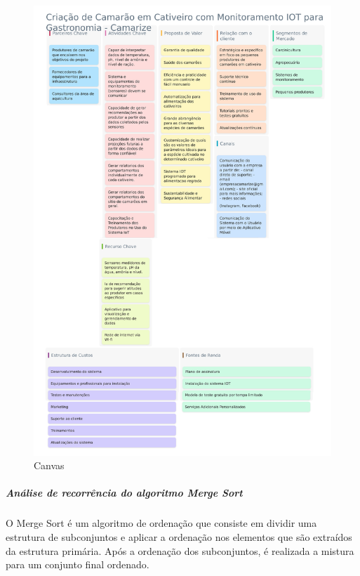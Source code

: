 \newpage

    \begin{figure}[!htb]
        \centering
        \caption{Canvas}%
        \label{fig:canvas}
        \includegraphics[width = 1.1\CaptionWidth]{Imagem/Canvas.png}
    \end{figure}

\newpage

\subparagraph*{\textbf{Análise de recorrência do algoritmo Merge Sort}}

O Merge Sort é um algoritmo de ordenação que consiste em dividir uma estrutura de subconjuntos e aplicar a ordenação nos elementos que são extraídos da estrutura primária. Após a ordenação dos subconjuntos, é realizada a mistura para um conjunto final ordenado.

